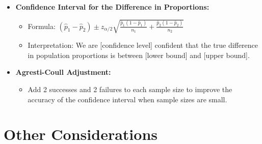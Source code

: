 \documentclass{article}
\begin{document}
\begin{multicols}{2}
\begin{itemize}
\begin{itemize}
\begin{itemize}
            \end{itemize}
    \end{itemize}
\item \textbf{Confidence Interval for the Difference in Proportions:}
    \begin{itemize}
        \item Formula: $(\hat{p}_1 - \hat{p}_2) \pm z_{\alpha/2} \sqrt{\frac{\hat{p}_1(1-\hat{p}_1)}{n_1} + \frac{\hat{p}_2(1-\hat{p}_2)}{n_2}}$
        \item Interpretation: We are [confidence level] confident that the true difference in population proportions is between [lower bound] and [upper bound].
    \end{itemize}
\item \textbf{Agresti-Coull Adjustment:}
    \begin{itemize}
        \item Add 2 successes and 2 failures to each sample size to improve the accuracy of the confidence interval when sample sizes are small.
    \end{itemize}
\end{itemize}

\section*{Other Considerations}


\end{multicols}
\end{document}
